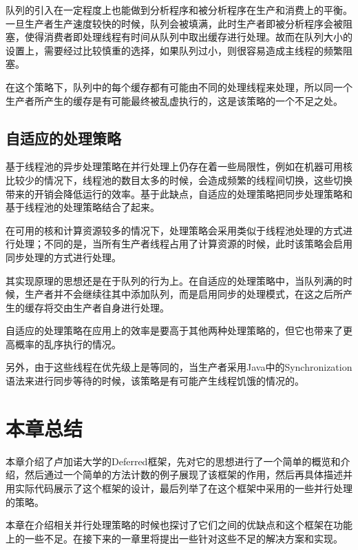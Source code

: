 队列的引入在一定程度上也能做到分析程序和被分析程序在生产和消费上的平衡。一旦生产者生产速度较快的时候，队列会被填满，此时生产者即被分析程序会被阻塞，使得消费者即处理线程有时间从队列中取出缓存进行处理。故而在队列大小的设置上，需要经过比较慎重的选择，如果队列过小，则很容易造成主线程的频繁阻塞。

在这个策略下，队列中的每个缓存都有可能由不同的处理线程来处理，所以同一个生产者所产生的缓存是有可能最终被乱虚执行的，这是该策略的一个不足之处。

\subsection{自适应的处理策略}

基于线程池的异步处理策略在并行处理上仍存在着一些局限性，例如在机器可用核比较少的情况下，线程池的数目太多的时候，会造成频繁的线程间切换，这些切换带来的开销会降低运行的效率。基于此缺点，自适应的处理策略把同步处理策略和基于线程池的处理策略结合了起来。

在可用的核和计算资源较多的情况下，处理策略会采用类似于线程池处理的方式进行处理；不同的是，当所有生产者线程占用了计算资源的时候，此时该策略会启用同步处理的方式进行处理。

其实现原理的思想还是在于队列的行为上。在自适应的处理策略中，当队列满的时候，生产者并不会继续往其中添加队列，而是启用同步的处理模式，在这之后所产生的缓存将交由生产者自身进行处理。

自适应的处理策略在应用上的效率是要高于其他两种处理策略的，但它也带来了更高概率的乱序执行的情况。

另外，由于这些线程在优先级上是等同的，当生产者采用Java中的Synchronization语法来进行同步等待的时候，该策略是有可能产生线程饥饿的情况的。

\section{本章总结}

本章介绍了卢加诺大学的Deferred框架，先对它的思想进行了一个简单的概览和介绍，然后通过一个简单的方法计数的例子展现了该框架的作用，然后再具体描述并用实际代码展示了这个框架的设计，最后列举了在这个框架中采用的一些并行处理的策略。

本章在介绍相关并行处理策略的时候也探讨了它们之间的优缺点和这个框架在功能上的一些不足。在接下来的一章里将提出一些针对这些不足的解决方案和实现。
